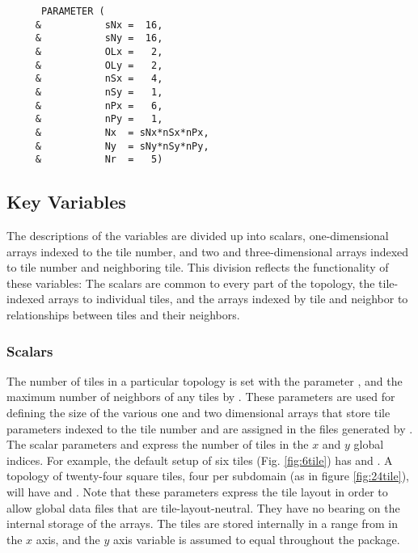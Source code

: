 \begin{verbatim}
      PARAMETER (
     &           sNx =  16,
     &           sNy =  16,
     &           OLx =   2,
     &           OLy =   2,
     &           nSx =   4,
     &           nSy =   1,
     &           nPx =   6,
     &           nPy =   1,
     &           Nx  = sNx*nSx*nPx,
     &           Ny  = sNy*nSy*nPy,
     &           Nr  =   5)
\end{verbatim}





\subsection{Key Variables}

The descriptions of the variables are divided up into scalars,
one-dimensional arrays indexed to the tile number, and two and
three-dimensional arrays indexed to tile number and neighboring tile.
This division reflects the functionality of these variables: The
scalars are common to every part of the topology, the tile-indexed
arrays to individual tiles, and the arrays indexed by tile and
neighbor to relationships between tiles and their neighbors. \\

\subsubsection{Scalars}

The number of tiles in a particular topology is set with the parameter
, and the maximum number of neighbors of any tiles by
.  These parameters are used for defining the
size of the various one and two dimensional arrays that store tile
parameters indexed to the tile number and are assigned in the files
generated by .\\

The scalar parameters 
and  express the number
of tiles in the $x$ and $y$ global indices.  For example, the default
setup of six tiles (Fig. \ref{fig:6tile}) has
 and .  A
topology of twenty-four square tiles, four per subdomain (as in figure
\ref{fig:24tile}), will have  and
.  Note that these parameters express the
tile layout in order to allow global data files that are tile-layout-neutral.
They have no bearing on the internal storage of the arrays.  The tiles
are stored internally in a range from  in the
$x$ axis, and the $y$ axis variable  is assumed to 
equal  throughout the package. \\

